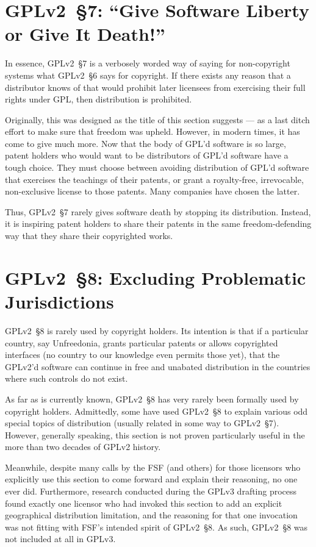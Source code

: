 \section{GPLv2~\S7: ``Give Software Liberty or Give It Death!''}
\label{GPLv2s7}

In essence, GPLv2~\S7 is a verbosely worded way of saying for non-copyright
systems what GPLv2~\S6 says for copyright.  If there exists any reason that a
distributor knows of that would prohibit later licensees from exercising
their full rights under GPL, then distribution is prohibited.

Originally, this was designed as the title of this section suggests --- as
a last ditch effort to make sure that freedom was upheld.  However, in
modern times, it has come to give much more.  Now that the body of GPL'd
software is so large, patent holders who would want to be distributors of
GPL'd software have a tough choice.  They must choose between avoiding
distribution of GPL'd software that exercises the teachings of their
patents, or grant a royalty-free, irrevocable, non-exclusive license to
those patents.  Many companies have chosen the latter.

Thus, GPLv2~\S7 rarely gives software death by stopping its distribution.
Instead, it is inspiring patent holders to share their patents in the same
freedom-defending way that they share their copyrighted works.

\section{GPLv2~\S8: Excluding Problematic Jurisdictions}
\label{GPLv2s8}

GPLv2~\S8 is rarely used by copyright holders.  Its intention is that if a
particular country, say Unfreedonia, grants particular patents or allows
copyrighted interfaces (no country to our knowledge even permits those
yet), that the GPLv2'd software can continue in free and unabated
distribution in the countries where such controls do not exist.

As far as is currently known, GPLv2~\S8 has very rarely been formally used by
copyright holders.  Admittedly, some have used GPLv2~\S8 to explain various
odd special topics of distribution (usually related in some way to
GPLv2~\S7).  However, generally speaking, this section is not proven
particularly useful in the more than two decades of GPLv2 history.

Meanwhile, despite many calls by the FSF (and others) for those licensors who
explicitly use this section to come forward and explain their reasoning, no
one ever did.  Furthermore, research conducted during the GPLv3 drafting
process found exactly one licensor who had invoked this section to add an
explicit geographical distribution limitation, and the reasoning for that one
invocation was not fitting with FSF's intended spirit of GPLv2~\S8.  As such,
GPLv2~\S8 was not included at all in GPLv3.

